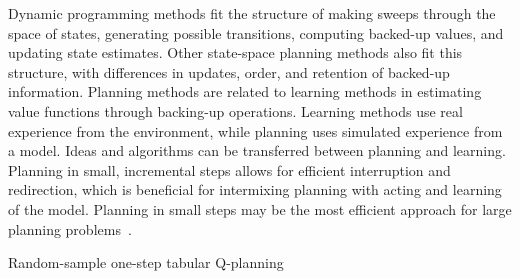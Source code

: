 \documentclass[../xlapes02]{subfiles}
\begin{document}
    \begin{center}
    \end{center}

    Dynamic programming methods fit the structure of making sweeps through the space of states, generating possible transitions, computing backed-up values, and updating state estimates. Other state-space planning methods also fit this structure, with differences in updates, order, and retention of backed-up information. Planning methods are related to learning methods in estimating value functions through backing-up operations. Learning methods use real experience from the environment, while planning uses simulated experience from a model. Ideas and algorithms can be transferred between planning and learning. Planning in small, incremental steps allows for efficient interruption and redirection, which is beneficial for intermixing planning with acting and learning of the model. Planning in small steps may be the most efficient approach for large planning problems~\cite{sutton2018reinforcement}.
    \begin{algorithm}[H]
        \label{alg:random-sample-one-step-tabular-q-planning}
        \SetAlgoLined
        \caption{Random-sample one-step tabular Q-planning}
    \end{algorithm}
\end{document}

